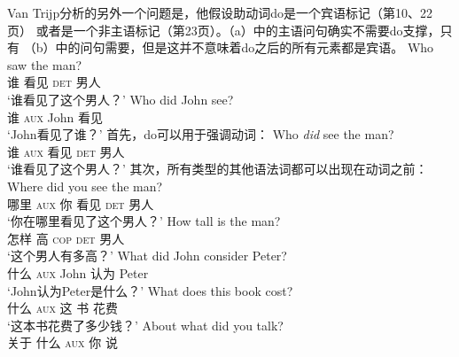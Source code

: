 Van Trijp分析的另外一个问题是，他假设助动词do是一个宾语标记（第10、22页） 或者是一个非主语标记（第23页）。（a）中的主语问句确实不需要do支撑，只有 （b）中的问句需要，但是这并不意味着do之后的所有元素都是宾语。
\eal
\ex 
\gll Who saw the man?\\  
     谁 看见 \textsc{det} 男人\\
\glt `谁看见了这个男人？'
\ex 
\gll Who did John see?\\  
     谁 \textsc{aux} John 看见\\
\glt `John看见了谁？'
\zl
首先，do可以用于强调动词：
\ea
\gll Who \emph{did} see the man?\\  
     谁 \textsc{aux} 看见 \textsc{det} 男人\\
\glt `谁看见了这个男人？'
\z
其次，所有类型的其他语法词都可以出现在动词之前：
\eal
\settowidth{}
\ex
\gll Where did you see the man?\\    
     哪里 \textsc{aux} 你 看见 \textsc{det} 男人\\
\glt `你在哪里看见了这个男人？'
\ex 
\gll How tall is the man?\\     
     怎样 高 \textsc{cop} \textsc{det} 男人\\
\glt `这个男人有多高？'
\ex
\gll What did John consider Peter?\\     
     什么 \textsc{aux} John 认为 Peter\\ 
\glt `John认为Peter是什么？'
\ex 
\gll What does this book cost?\\
     什么 \textsc{aux} 这 书 花费\\       
\glt `这本书花费了多少钱？'
\ex 
\gll About what did you talk?\\       
     关于 什么 \textsc{aux} 你 说\\ 
